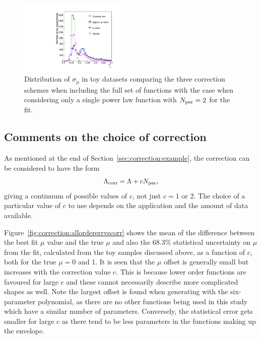 \begin{figure}[tbp]
\centering
\includegraphics[width=0.45\textwidth]{correction/compare_error_magnitude.pdf}
\caption{Distribution of $\sigma_{\mu}$ in toy datasets
comparing the three correction schemes
when including the full set of functions
with the case when considering only a single power law function
with $N_{\rm par}=2$ for the fit.}
\label{fig:correction:compareerrors}
\end{figure}

\subsection{Comments on the choice of correction}
\label{sec:correction:comments}
 As mentioned at the end of Section~\ref{sec:correction:example}, 
the correction can be considered to have the form
\begin{displaymath}
\Lambda_{\mathrm{corr}} = \textrm{\ensuremath{\Lambda}} + cN_{\rm par},
\end{displaymath}
giving a continuum of possible values of $c$, not just $c=1$ or 2.
The choice of a particular value of $c$ to use depends on the application
and the amount of data available.

Figure~\ref{fig:correction:allordererrvscorr} shows the mean of the difference
between the best fit $\mu$ value and the true $\mu$ and also the 68.3\%
statistical uncertainty on $\mu$ from the fit, calculated from the toy
samples discussed above, as a function of $c$, 
both for the true $\mu=0$ and 1. It is seen that the $\mu$ offset
is generally small but increases with the correction value $c$. This is
because lower order functions are favoured for large $c$ and these cannot
necessarily describe more complicated shapes as well. Note the largest
offset is found when generating with the six-parameter polynomial, as there
are no other functions being used in this study which have a similar number
of parameters. 
Conversely, the
statistical error gets smaller for large $c$ as there tend to be less parameters
in the functions making up the envelope. 

